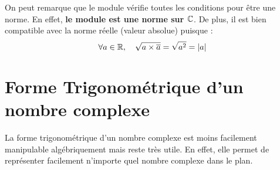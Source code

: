 \begin{remark}
    On peut remarque que le module vérifie toutes les conditions pour être une norme. 
    En effet, \textbf{le module est une norme sur $\mathbb{C}$}. 
    De plus, il est bien compatible avec la norme réelle (valeur absolue) puisque : 
        \[ \forall a \in \mathbb{R}, \quad \sqrt{a \times \overline{a}} = \sqrt{a^2} = |a| \] 
\end{remark}


\section{Forme Trigonométrique d'un nombre complexe}

La forme trigonométrique d'un nombre complexe est moins facilement manipulable algébriquement mais reste très utile. 
En effet, elle permet de représenter facilement n'importe quel nombre complexe dans le plan. 

